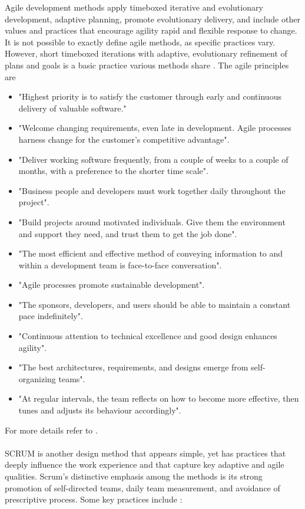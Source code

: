 \documentclass[10pt, a4paper, titlepage]{article}
\begin{document}
Agile development methods apply timeboxed iterative and evolutionary development, adaptive planning, promote evolutionary delivery, and include other values and practices that encourage agility rapid and flexible response to change. It is not possible to exactly define agile methods, as specific practices vary. However, short timeboxed iterations with adaptive, evolutionary refinement of plans and goals is a basic practice various methods share \cite{Agile_book}. The agile principles are 
\begin{itemize}
\item "Highest priority is to satisfy the customer through early and continuous delivery of valuable software."
\item "Welcome changing requirements, even late in development. Agile processes harness change for the customer's competitive advantage".
\item "Deliver working software frequently, from a couple of weeks to a couple of months, with a preference to the shorter time scale".
\item "Business people and developers must work together daily throughout the project".
\item "Build projects around motivated individuals. Give them the environment and support they need, and trust them to get the job done".
\item "The most efficient and effective method of conveying information to and within a development team is face-to-face conversation".
\item "Agile processes promote sustainable development".
\item "The sponsors, developers, and users should be able to maintain a constant pace indefinitely".
\item "Continuous attention to technical excellence and good design enhances agility".
\item "The best architectures, requirements, and designs emerge from self-organizing teams".
\item "At regular intervals, the team reflects on how to become more effective, then tunes and adjusts its behaviour accordingly".
\end{itemize}
For more details refer to \cite{Agile_book}.\\\\

SCRUM is another design method that appears simple, yet has practices that deeply influence the work experience and that capture key adaptive and agile qualities. Scrum's distinctive emphasis among the methods is its strong promotion of self-directed teams, daily team measurement, and avoidance of prescriptive process. Some key practices include \cite{Agile_book}: 
\end{document}
